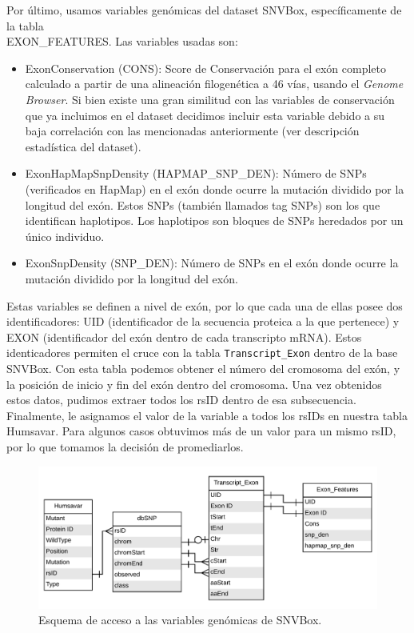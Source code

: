 Por último, usamos variables genómicas del dataset SNVBox, específicamente de la tabla \\ EXON\_FEATURES. Las variables usadas son:
\begin{itemize}
    \item ExonConservation (CONS): Score de Conservación para el exón completo calculado a partir de una alineación filogenética a 46 vías, usando el \textit{Genome Browser}. Si bien existe una gran similitud con las variables de conservación que ya incluimos en el dataset decidimos incluir esta variable debido a su baja correlación con las mencionadas anteriormente (ver descripción estadística del dataset).
    \item ExonHapMapSnpDensity (HAPMAP\_SNP\_DEN): Número de SNPs (verificados en HapMap) en el exón donde ocurre la mutación dividido por la longitud del exón. Estos SNPs (también llamados tag SNPs) son los que identifican haplotipos. Los haplotipos son bloques de SNPs heredados por un único individuo.
    \item ExonSnpDensity (SNP\_DEN): Número de SNPs en el exón donde ocurre la mutación dividido por la longitud del exón.
\end{itemize}

Estas variables se definen a nivel de exón, por lo que cada una de ellas posee dos identificadores: UID (identificador de la secuencia proteica a la que pertenece) y EXON (identificador del exón dentro de cada transcripto mRNA). Estos identicadores permiten el cruce con la tabla \texttt{Transcript\_Exon} dentro de la base SNVBox. Con esta tabla podemos obtener el número del cromosoma del exón, y la posición de inicio y fin del exón dentro del cromosoma. Una vez obtenidos estos datos, pudimos extraer todos los rsID dentro de esa subsecuencia. Finalmente, le asignamos el valor de la variable a todos los rsIDs en nuestra tabla Humsavar. Para algunos casos obtuvimos más de un valor para un mismo rsID, por lo que tomamos la decisión de promediarlos.


\begin{figure}[H]
\centering
    \includegraphics[scale=0.55]{documents/latex/figures/3/genomic/exon_diagram.pdf}
    \caption{Esquema de acceso a las variables genómicas de SNVBox.}
    \label{fig:exon_diagram}
\end{figure}

